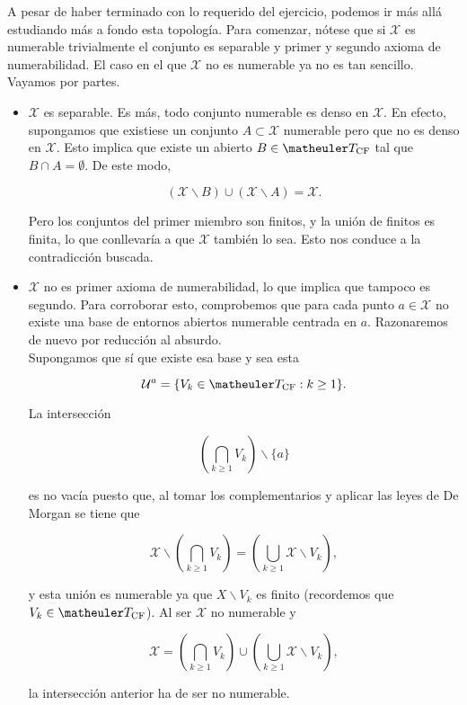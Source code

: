 A pesar de haber terminado con lo requerido del ejercicio, podemos ir más allá estudiando más a fondo esta topología. Para comenzar, nótese que si $\mathcal{X}$ es numerable trivialmente el conjunto es separable y primer y segundo axioma de numerabilidad. El caso en el que $\mathcal{X}$ no es numerable ya no es tan sencillo. Vayamos por partes.

\begin{itemize}
\item $\mathcal{X}$ es separable. Es más, todo conjunto numerable es denso en $\mathcal{X}$. En efecto, supongamos que existiese un conjunto $A \subset \mathcal{X}$ numerable pero que no es denso en $\mathcal{X}$. Esto implica que existe un abierto $B\in \T_{\text{CF}}$ tal que $B\cap A = \emptyset$. De este modo, 

\[(\mathcal{X}\backslash B)\cup (\mathcal{X}\backslash A)=\mathcal{X}.\]

Pero los conjuntos del primer miembro son finitos, y la unión de finitos es finita, lo que conllevaría a que $\mathcal{X}$ también lo sea. Esto nos conduce a la  contradicción buscada. 

\item $\mathcal{X}$ no es primer axioma de numerabilidad, lo que implica que tampoco es segundo. Para corroborar esto, comprobemos que para cada punto $a\in \mathcal{X}$ no existe una base de entornos abiertos numerable centrada en $a$. Razonaremos de nuevo por reducción al absurdo. \\

Supongamos que sí que existe esa base y sea esta 

\[\mathcal{U}^a=\{V_k \in\T_{\text{CF}}: k \geq 1\}.\]

La intersección 

\[\left(\bigcap_{k\geq 1} V_k\right)\backslash \{a\}\]

es no vacía puesto que, al tomar los complementarios y aplicar las leyes de De Morgan se tiene que 

\[\mathcal{X} \backslash \left(\bigcap_{k\geq 1} V_k\right)= \left(\bigcup_{k\geq 1} \mathcal{X} \backslash V_k\right), \]

y esta unión es numerable ya que $X \backslash V_k$ es finito (recordemos que $V_k \in \T_{\text{CF}}$). Al ser $\mathcal{X}$ no numerable y 

\[\mathcal{X}= \left(\bigcap_{k\geq 1} V_k\right) \cup \left(\bigcup_{k\geq 1} \mathcal{X}\backslash V_k\right),\]

la intersección anterior ha de ser no numerable. \\


\end{itemize}
